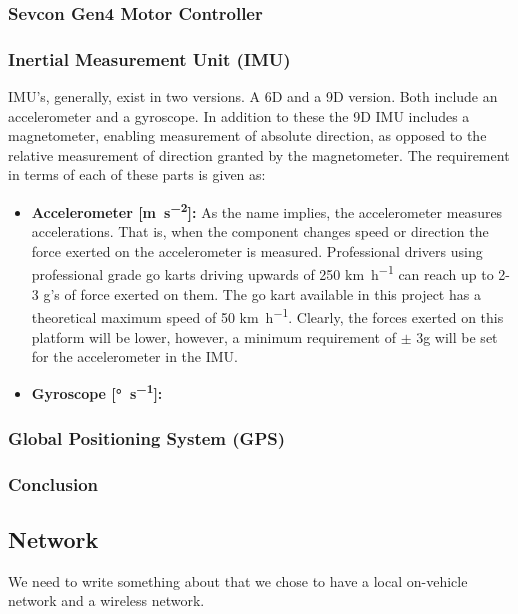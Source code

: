 \subsubsection*{Sevcon Gen4 Motor Controller}

\subsubsection*{Inertial Measurement Unit (IMU)}
IMU's, generally, exist in two versions.
A 6D and a 9D version.
Both include an accelerometer and a gyroscope.
In addition to these the 9D IMU includes a magnetometer, enabling measurement of absolute direction, as opposed to the relative measurement of direction granted by the magnetometer.
The requirement in terms of each of these parts is given as:
\begin{itemize}
	\item \textbf{Accelerometer [\si{\metre\per\second^2}]:} As the name implies, the accelerometer measures accelerations.
	That is, when the component changes speed or direction the force exerted on the accelerometer is measured.
	Professional drivers using professional grade go karts driving upwards of 250 \si{\kilo\metre\per\hour} can reach up to 2-3 g's of force exerted on them.
	The go kart available in this project has a theoretical maximum speed of 50 \si{\kilo\metre\per\hour}.
	Clearly, the forces exerted on this platform will be lower, however, a minimum requirement of $\pm$ 3g will be set for the accelerometer in the IMU.
	\item \textbf{Gyroscope [\si{\degree\per\second}]:} 
\end{itemize}

\subsubsection*{Global Positioning System (GPS)}


\subsubsection*{Conclusion}









\subsection{Network}
We need to write something about that we chose to have a local on-vehicle network and a wireless network.

